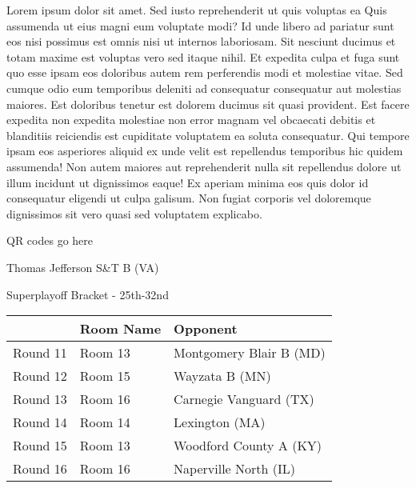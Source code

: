 \documentclass{article}%
\begin{document}
\vspace*{8pt}%
\linebreak%
\newline%
\newline%
    Lorem ipsum dolor sit amet. Sed iusto reprehenderit ut quis voluptas ea Quis assumenda ut eius magni eum voluptate modi? Id unde libero ad pariatur sunt eos nisi possimus est omnis nisi ut internos laboriosam. Sit nesciunt ducimus et totam maxime est voluptas vero sed itaque nihil. Et expedita culpa et fuga sunt quo esse ipsam eos doloribus autem rem perferendis modi et molestiae vitae.\newline%
\newline%
    Sed cumque odio eum temporibus deleniti ad consequatur consequatur aut molestias maiores. Est doloribus tenetur est dolorem ducimus sit quasi provident. Est facere expedita non expedita molestiae non error magnam vel obcaecati debitis et blanditiis reiciendis est cupiditate voluptatem ea soluta consequatur. Qui tempore ipsam eos asperiores aliquid ex unde velit est repellendus temporibus hic quidem assumenda!\newline%
\newline%
    Non autem maiores aut reprehenderit nulla sit repellendus dolore ut illum incidunt ut dignissimos eaque! Ex aperiam minima eos quis dolor id consequatur eligendi ut culpa galisum. Non fugiat corporis vel doloremque dignissimos sit vero quasi sed voluptatem explicabo.\newline%
\newline%
\vspace*{30pt}%
\begin{center}%
\begin{Huge}%
QR codes go here%
\end{Huge}%
\end{center}%
\newpage%
\begin{center}%
\begin{Huge}%
Thomas Jefferson S\&T B (VA)%
\end{Huge}%
\vspace*{8pt}%
\linebreak%
\begin{Large}%
Superplayoff Bracket {-} 25th{-}32nd%
\end{Large}%
\end{center}%
%
\begin{tabularx}{\textwidth}{|c|Y|Y|}%
\hline%
&Room Name&Opponent\\%
\hline%
Round 11&Room 13&Montgomery Blair B (MD)\\%
Round 12&Room 15&Wayzata B (MN)\\%
Round 13&Room 16&Carnegie Vanguard (TX)\\%
Round 14&Room 14&Lexington (MA)\\%
Round 15&Room 13&Woodford County A (KY)\\%
Round 16&Room 16&Naperville North (IL)\\%
\hline%
\end{tabularx}%
\end{document}
